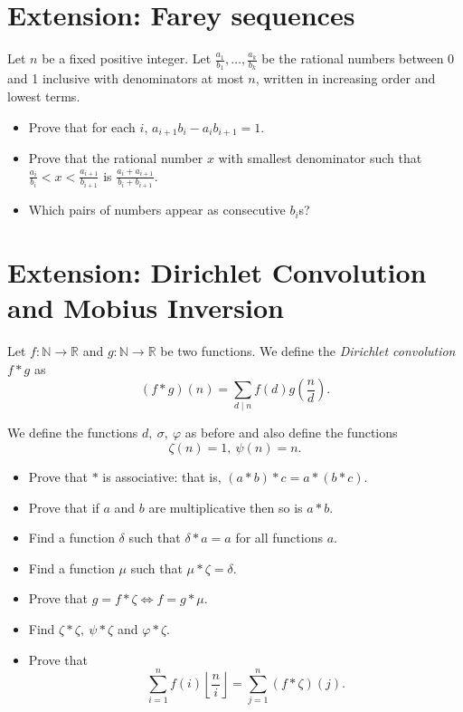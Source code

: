 \documentclass{article}
\begin{document}
\section{Extension: Farey sequences}
  Let $n$ be a fixed positive integer. Let
  $\frac{a_1}{b_1},\ldots,\frac{a_k}{b_k}$ be the rational numbers between 0
  and 1 inclusive with denominators at most $n$, written in increasing order
  and lowest terms.
  \begin{itemize}
    \item Prove that for each $i$, $a_{i+1}b_i-a_i b_{i+1}=1$.
    \item Prove that the rational number $x$ with smallest denominator such
      that $\frac{a_i}{b_i}<x<\frac{a_{i+1}}{b_{i+1}}$ is
      $\frac{a_i+a_{i+1}}{b_i+b_{i+1}}$. 
    \item Which pairs of numbers appear as consecutive $b_i$s?
  \end{itemize}
\section{Extension: Dirichlet Convolution and Mobius Inversion}
  Let $f:\mathbb N\to\mathbb R$ and $g:\mathbb N\to\mathbb R$ be two functions.
  We define the \emph{Dirichlet convolution} $f*g$ as
  \[(f*g)(n)=\sum_{d\mid n}f(d)g\left(\frac nd\right).\]

  We define the functions $d,\ \sigma,\ \varphi$ as before and also define the
  functions \[\zeta(n)=1,\ \psi(n)=n.\]
  \begin{itemize}
    \item Prove that $*$ is associative: that is,
      $(a*b)*c=a*(b*c)$.
    \item Prove that if $a$ and $b$ are multiplicative then so is $a*b$.
    \item Find a function $\delta$ such that $\delta*a=a$ for all functions $a$.
    \item Find a function $\mu$ such that $\mu*\zeta=\delta$.
    \item Prove that $g=f*\zeta\iff f=g*\mu$.
    \item Find $\zeta*\zeta,\ \psi*\zeta$ and $\varphi*\zeta$.
    \item Prove that
      \[\sum_{i=1}^n f(i)\left\lfloor\frac
          ni\right\rfloor=\sum_{j=1}^n(f*\zeta)(j).\]
  \end{itemize}
  \newpage
\end{document}
